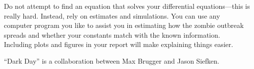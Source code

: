 Do not attempt to find an equation that solves your differential equations---this is really hard.
Instead, rely on estimates and simulations.  You can use any computer program you like to assist you in estimating how the zombie outbreak spreads and whether your constants match with the known information.  Including plots and figures in your report will make explaining things easier.



\vfill

\hfill ``Dark Day'' is a collaboration between Max Brugger and Jason Siefken.

\begin{noexercises}
\end{noexercises}